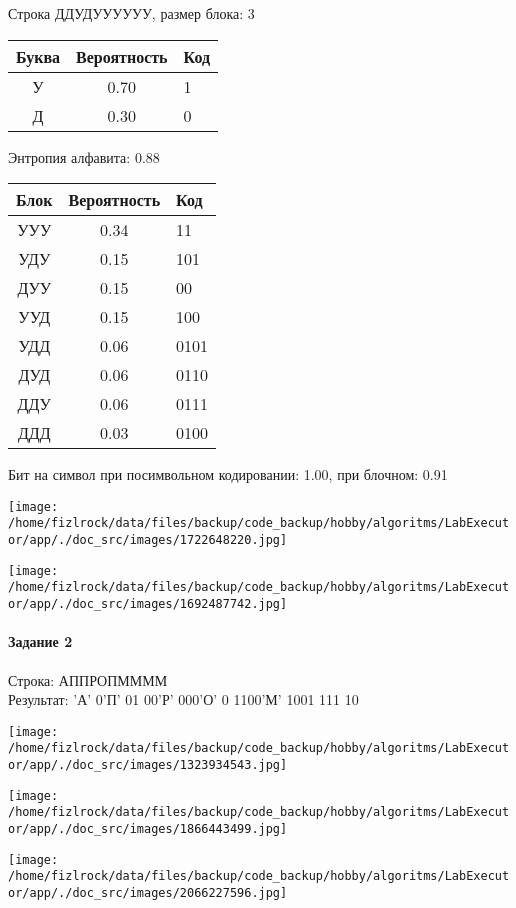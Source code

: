 \documentclass[a4paper, 12pt]{article}
\begin{document}
Строка ДДУДУУУУУУ, размер блока: 3
\begin{center}
 \begin{tabular}{ |c|c|l| } 
  \hline
     Буква & Вероятность & Код\\ \hline
У & 0.70 & 1\\\hline
Д & 0.30 & 0
\\ \hline \end{tabular}
\end{center}
Энтропия алфавита: 0.88
\begin{center}
 \begin{tabular}{ |c|c|l| } 
  \hline
     Блок & Вероятность & Код\\ \hline
УУУ & 0.34 & 11\\\hline
УДУ & 0.15 & 101\\\hline
ДУУ & 0.15 & 00\\\hline
УУД & 0.15 & 100\\\hline
УДД & 0.06 & 0101\\\hline
ДУД & 0.06 & 0110\\\hline
ДДУ & 0.06 & 0111\\\hline
ДДД & 0.03 & 0100
\\ \hline \end{tabular}
\end{center}
Бит на символ при посимвольном кодировании: 1.00, при блочном: 0.91

\texttt{[image: /home/fizlrock/data/files/backup/code\_backup/hobby/algoritms/LabExecutor/app/./doc\_src/images/1722648220.jpg]}

\texttt{[image: /home/fizlrock/data/files/backup/code\_backup/hobby/algoritms/LabExecutor/app/./doc\_src/images/1692487742.jpg]}
\pagebreak
\paragraph{Задание 2}

Строка: 
АППРОПММММ\\
Результат: 'А' 0'П' 01 00'Р' 000'О' 0 1100'М' 1001 111 10

\texttt{[image: /home/fizlrock/data/files/backup/code\_backup/hobby/algoritms/LabExecutor/app/./doc\_src/images/1323934543.jpg]}

\texttt{[image: /home/fizlrock/data/files/backup/code\_backup/hobby/algoritms/LabExecutor/app/./doc\_src/images/1866443499.jpg]}

\texttt{[image: /home/fizlrock/data/files/backup/code\_backup/hobby/algoritms/LabExecutor/app/./doc\_src/images/2066227596.jpg]}
\end{document}
